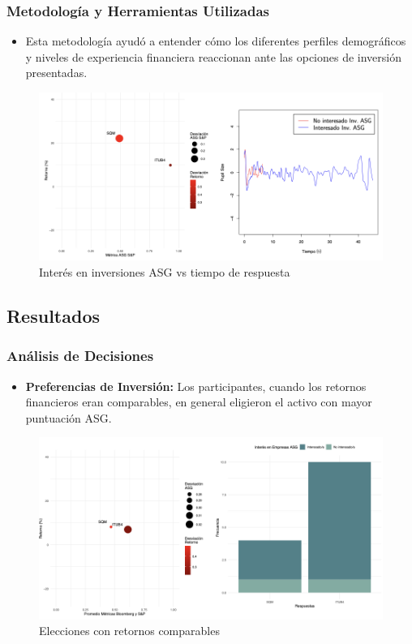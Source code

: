 \documentclass{beamer}
\begin{document}
\begin{frame}
    \frametitle{Metodología y Herramientas Utilizadas}
    \begin{itemize}
        \item Esta metodología ayudó a entender cómo los diferentes perfiles demográficos y niveles de experiencia financiera reaccionan ante las opciones de inversión presentadas.
    \end{itemize}
    \begin{figure}
        \centering
        \includegraphics[width=0.7\linewidth]{Latex/defensa/perfiles_resultados.png}
        \caption{Interés en inversiones ASG vs tiempo de respuesta}

    \end{figure}
\end{frame}

\subsection{Resultados}
\begin{frame}
    \frametitle{Análisis de Decisiones}
    \begin{itemize}
        \item \textbf{Preferencias de Inversión:} Los participantes, cuando los retornos financieros eran comparables, en general eligieron el activo con mayor puntuación ASG.
    \end{itemize}
    \begin{figure}
        \centering
        \includegraphics[width=0.7\linewidth]{Latex/defensa/eleccion.png}
        \caption{Elecciones con retornos comparables}
    \end{figure}
\end{frame}
\end{document}
